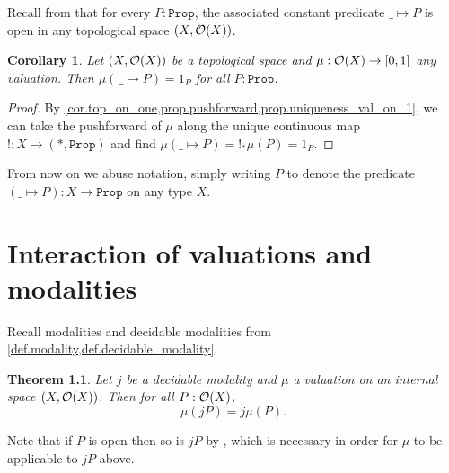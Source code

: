 \documentclass[11pt, oneside, article]{memoir}
\theoremstyle{plain}
\newtheorem{theorem}{Theorem}[chapter] %
\newtheorem{corollary}[theorem]{Corollary}
\theoremstyle{definition}
\theoremstyle{remark}
\newcommand{\const}[1]{\mathtt{#1}}
\newcommand{\ind}[1]{1_{#1}}
\newcommand{\prop}{\const{Prop}}
\newcommand{\Op}[1][undef]{\ifthenelse{\equal{#1}{undef}}{\mathcal{O}}{\mathcal{O}(#1)}}
\begin{document}
Recall from  that for every $P : \prop$, the associated constant predicate $\_ \mapsto P$ is open in any topological space $(X,\Op[X])$. 

\begin{corollary}\label{cor.val_const_indicator}
	Let $(X,\Op[X])$ be a topological space and $\mu : \Op[X] \to [0,1]$ any valuation. Then $\mu(\,\_\mapsto P) = \ind{P}$ for all $P : \prop$.
\end{corollary}

\begin{proof}
	By \cref{cor.top_on_one,prop.pushforward,prop.uniqueness_val_on_1}, we can take the pushforward of $\mu$ along the unique continuous map $!\colon X\to (*,\prop)$ and find $\mu(\_\mapsto P)=!_*\mu(P)=\ind{P}$.
\end{proof}

From now on we abuse notation, simply writing $P$ to denote the predicate $(\_\mapsto P)\colon X\to\prop$ on any type $X$.

\chapter{Interaction of valuations and modalities}


Recall modalities and decidable modalities from \cref{def.modality,def.decidable_modality}. 
\begin{theorem}
	\label{vals_vs_modalities}
	Let $j$ be a decidable modality and $\mu$ a valuation on an internal space $(X,\Op[X])$. Then for all $P : \Op[X]$,
	\[
		\mu(jP) = j \mu(P).	
	\]
\end{theorem}

Note that if $P$ is open then so is $jP$ by , which is necessary in order for $\mu$ to be applicable to $jP$ above.
\end{document}
